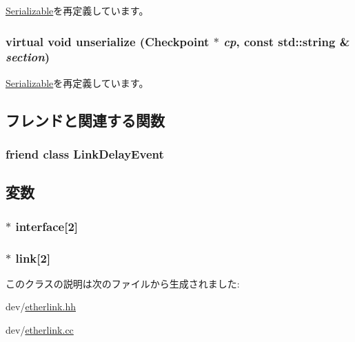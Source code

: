 \hyperlink{classSerializable_ad6272f80ae37e8331e3969b3f072a801}{Serializable}を再定義しています。\hypertarget{classEtherLink_af100c4e9feabf3cd918619c88c718387}{
\subsubsection[{unserialize}]{\setlength{\rightskip}{0pt plus 5cm}virtual void unserialize ({\bf Checkpoint} $\ast$ {\em cp}, \/  const std::string \& {\em section})}}
\label{classEtherLink_af100c4e9feabf3cd918619c88c718387}


\hyperlink{classSerializable_af100c4e9feabf3cd918619c88c718387}{Serializable}を再定義しています。

\subsection{フレンドと関連する関数}
\hypertarget{classEtherLink_ae08a8e78387040792a618717ab8c6332}{
\subsubsection[{LinkDelayEvent}]{\setlength{\rightskip}{0pt plus 5cm}friend class {\bf LinkDelayEvent}}}
\label{classEtherLink_ae08a8e78387040792a618717ab8c6332}


\subsection{変数}
\hypertarget{classEtherLink_ac7117d0bc6bfdce6b73ab381c847909a}{
\subsubsection[{interface}]{$\ast$ {\bf interface}\mbox{[}2\mbox{]}}}
\label{classEtherLink_ac7117d0bc6bfdce6b73ab381c847909a}
\hypertarget{classEtherLink_a50d0cd7994bfc3d687f328f1e292c7ab}{
\subsubsection[{link}]{$\ast$ {\bf link}\mbox{[}2\mbox{]}}}
\label{classEtherLink_a50d0cd7994bfc3d687f328f1e292c7ab}


このクラスの説明は次のファイルから生成されました:\begin{DoxyCompactItemize}
\item 
dev/\hyperlink{etherlink_8hh}{etherlink.hh}\item 
dev/\hyperlink{etherlink_8cc}{etherlink.cc}\end{DoxyCompactItemize}
